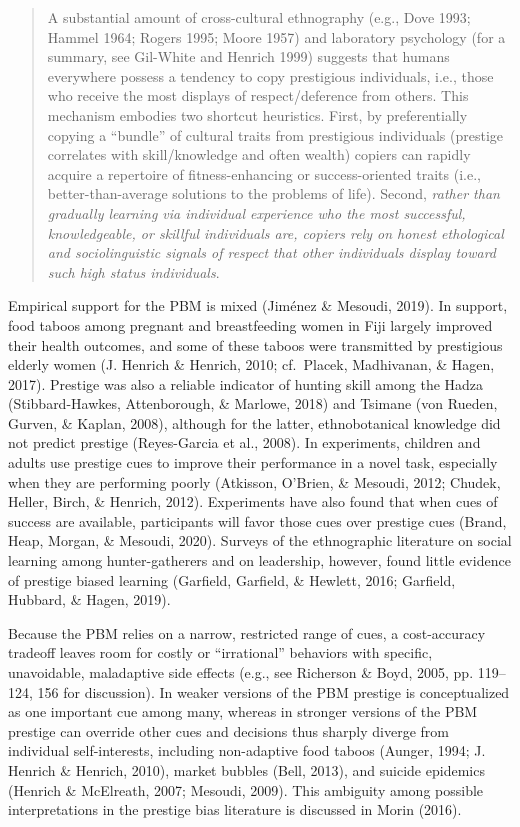 \documentclass[
  11pt,
]{article}
\begin{document}
\begin{quote}
A substantial amount of cross-cultural ethnography (e.g., Dove 1993;
Hammel 1964; Rogers 1995; Moore 1957) and laboratory psychology (for a
summary, see Gil-White and Henrich 1999) suggests that humans everywhere
possess a tendency to copy prestigious individuals, i.e., those who
receive the most displays of respect/deference from others. This
mechanism embodies two shortcut heuristics. First, by preferentially
copying a ``bundle'' of cultural traits from prestigious individuals
(prestige correlates with skill/knowledge and often wealth) copiers can
rapidly acquire a repertoire of fitness-enhancing or success-oriented
traits (i.e., better-than-average solutions to the problems of life).
Second, \emph{rather than gradually learning via individual experience
who the most successful, knowledgeable, or skillful individuals are,
copiers rely on honest ethological and sociolinguistic signals of
respect that other individuals display toward such high status
individuals}.
\end{quote}

Empirical support for the PBM is mixed (Jiménez \& Mesoudi, 2019). In
support, food taboos among pregnant and breastfeeding women in Fiji
largely improved their health outcomes, and some of these taboos were
transmitted by prestigious elderly women (J. Henrich \& Henrich, 2010;
cf.~Placek, Madhivanan, \& Hagen, 2017). Prestige was also a reliable
indicator of hunting skill among the Hadza (Stibbard-Hawkes,
Attenborough, \& Marlowe, 2018) and Tsimane (von Rueden, Gurven, \&
Kaplan, 2008), although for the latter, ethnobotanical knowledge did not
predict prestige (Reyes-Garcia et al., 2008). In experiments, children
and adults use prestige cues to improve their performance in a novel
task, especially when they are performing poorly (Atkisson, O'Brien, \&
Mesoudi, 2012; Chudek, Heller, Birch, \& Henrich, 2012). Experiments
have also found that when cues of success are available, participants
will favor those cues over prestige cues (Brand, Heap, Morgan, \&
Mesoudi, 2020). Surveys of the ethnographic literature on social
learning among hunter-gatherers and on leadership, however, found little
evidence of prestige biased learning (Garfield, Garfield, \& Hewlett,
2016; Garfield, Hubbard, \& Hagen, 2019).

Because the PBM relies on a narrow, restricted range of cues, a
cost-accuracy tradeoff leaves room for costly or ``irrational''
behaviors with specific, unavoidable, maladaptive side effects (e.g.,
see Richerson \& Boyd, 2005, pp. 119--124, 156 for discussion). In
weaker versions of the PBM prestige is conceptualized as one important
cue among many, whereas in stronger versions of the PBM prestige can
override other cues and decisions thus sharply diverge from individual
self-interests, including non-adaptive food taboos (Aunger, 1994; J.
Henrich \& Henrich, 2010), market bubbles (Bell, 2013), and suicide
epidemics (Henrich \& McElreath, 2007; Mesoudi, 2009). This ambiguity
among possible interpretations in the prestige bias literature is
discussed in Morin (2016).
\end{document}
